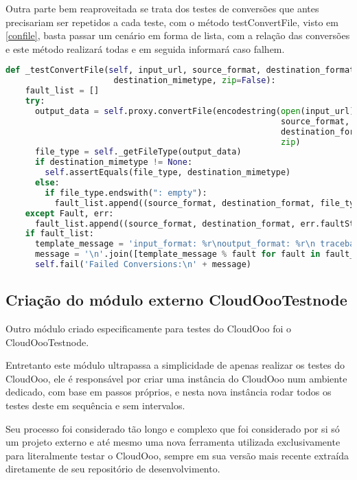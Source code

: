 Outra parte bem reaproveitada se trata dos testes de conversões que antes precisariam ser repetidos a cada teste, com o método testConvertFile, visto em \ref{confile}, basta passar um cenário em forma de lista, com a relação das conversões e este método realizará todas e em seguida informará caso falhem.

{\singlespace
\begin{lstlisting}[caption=testConvertFile do cloudoooTestCase,language=python,label={confile}]
  def _testConvertFile(self, input_url, source_format, destination_format,
                      destination_mimetype, zip=False):
    fault_list = []
    try:
      output_data = self.proxy.convertFile(encodestring(open(input_url).read()),
                                                        source_format,
                                                        destination_format,
                                                        zip)
      file_type = self._getFileType(output_data)
      if destination_mimetype != None:
        self.assertEquals(file_type, destination_mimetype)
      else:
        if file_type.endswith(": empty"):
          fault_list.append((source_format, destination_format, file_type))
    except Fault, err:
      fault_list.append((source_format, destination_format, err.faultString))
    if fault_list:
      template_message = 'input_format: %r\noutput_format: %r\n traceback:\n%s'
      message = '\n'.join([template_message % fault for fault in fault_list])
      self.fail('Failed Conversions:\n' + message)

\end{lstlisting}
}


\subsection{Criação do módulo externo CloudOooTestnode}

Outro módulo criado especificamente para testes do CloudOoo foi o CloudOooTestnode.

Entretanto este módulo ultrapassa a simplicidade de apenas realizar os testes do CloudOoo, ele é responsável por criar uma instância do CloudOoo num ambiente dedicado, com base em passos próprios, e nesta nova instância rodar todos os testes deste em sequência e sem intervalos.

Seu processo foi considerado tão longo e complexo que foi considerado por si só um projeto externo e até mesmo uma nova ferramenta utilizada exclusivamente para literalmente testar o CloudOoo, sempre em sua versão mais recente extraída diretamente de seu repositório de desenvolvimento.


